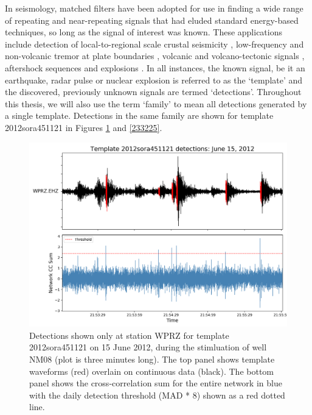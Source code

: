 In seismology, matched filters have been adopted for use in finding a wide range of repeating and near-repeating signals that had eluded standard energy-based techniques, so long as the signal of interest was known. These applications include detection of local-to-regional scale crustal seismicity \cite{Schaff_2011,Dodge_2015,Chamberlain_2017}, low-frequency and non-volcanic tremor at plate boundaries \citep{Shelly_2007,Chamberlain_2014}, volcanic and volcano-tectonic signals \citep{Shelly_2016,Hotovec_Ellis_2018}, aftershock sequences \citep{Warren_Smith_2017} and explosions \citep{Gibbons_2006,Gibbons_2012}. In all instances, the known signal, be it an earthquake, radar pulse or nuclear explosion is referred to as the `template' and the discovered, previously unknown signals are termed `detections'. Throughout this thesis, we will also use the term `family' to mean all detections generated by a single template. Detections in the same family are shown for template 2012sora451121 in Figures \ref{434259} and \ref{233225}.
\begin{figure}[h!]
\begin{center}
\includegraphics[width=0.70\columnwidth]{Chapter_2_Data/figures/2012sora451121_dets_cc_example/2012sora451121_dets_cc_example_original}
\caption{{Detections shown only at station WPRZ for template 2012sora451121 on 15
June 2012, during the stimluation of well NM08 (plot is three minutes
long). The top panel shows template waveforms (red) overlain on
continuous data (black). The bottom panel shows the cross-correlation
sum for the entire network in blue with the daily detection threshold
(MAD * 8) shown as a red dotted line.
{\label{434259}}%
}}
\end{center}
\end{figure}
